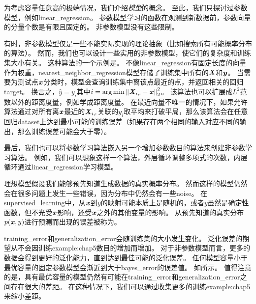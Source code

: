 
为考虑容量任意高的极端情况，我们介绍\emph{模型}的概念。
至此，我们只探讨过参数模型，例如\gls{linear_regression}。
参数模型学习的函数在观测到新数据前，参数向量的分量个数是有限且固定的。
非参数模型没有这些限制。

有时，非参数模型仅是一些不能实际实现的理论抽象（比如搜索所有可能概率分布的算法）。
然而，我们也可以设计一些实用的非参数模型，使它们的复杂度和训练集大小有关。
这种算法的一个示例是。
不像\gls{linear_regression}有固定长度的向量作为权重，\gls{nearest_neighbor_regression}模型存储了训练集中所有的$\boldsymbol{\mathit{X}}$和$\boldsymbol{\mathit{y}}$。
当需要为测试点$\boldsymbol{\mathit{x}}$分类时，模型会查询训练集中离该点最近的点，并返回相关的回归\gls{target}。
换言之，$\hat{y}=y_i$其中$i=\arg\min \left\lVert\boldsymbol{\mathit{X}}_{i,:}-\boldsymbol{\mathit{x}}\right\rVert_2^2$。
该算法也可以扩展成$L^2$范数以外的距离度量，例如学成距离度量\citep{RoweisNCA2005}。
在最近向量不唯一的情况下，如果允许算法通过对所有离$\boldsymbol{\mathit{x}}$最近的$\boldsymbol{\mathit{X}}_{i,:}$关联的$y_i$取平均来打破平局，那么该算法会在任意回归\gls{dataset}上达到最小可能的训练误差（如果存在两个相同的输入对应不同的输出，那么训练误差可能会大于零）。

最后，我们也可以将参数学习算法嵌入另一个增加参数数目的算法来创建非参数学习算法。
例如，我们可以想象这样一个算法，外层循环调整多项式的次数，内层循环通过\gls{linear_regression}学习模型。


理想模型假设我们能够预先知道生成数据的真实概率分布。
然而这样的模型仍然会在很多问题上发生一些错误，因为分布中仍然会有一些\gls{noise}。
在\gls{supervised_learning}中，从$\boldsymbol{\mathit{x}}$到$y$的映射可能本质上是随机的，或者$y$虽然是确定性函数，但不光受$\boldsymbol{\mathit{x}}$影响，还受$\boldsymbol{\mathit{x}}$之外的其他变量的影响。
从预先知道的真实分布$p(\boldsymbol{\mathit{x}},y)$进行预测而出现的误差被称为。

\gls{training_error}和\gls{generalization_error}会随训练集的大小发生变化。
泛化误差的期望从不会因训练\gls{example:chap5}数目的增加而增加。
对于非参数模型而言，更多的数据会得到更好的泛化能力，直到达到最佳可能的泛化误差。
任何模型容量小于最优容量的固定参数模型会渐近到大于\gls{bayes_error}的误差值。
如所示。
值得注意的是，具有最优容量的模型仍然有可能在\gls{training_error}和\gls{generalization_error}之间存在很大的差距。
在这种情况下，我们可以通过收集更多的训练\gls{example:chap5}来缩小差距。

